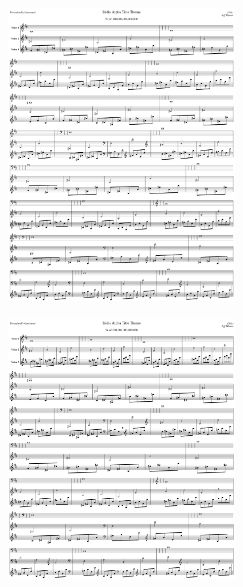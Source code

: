 \begin{figure}[H]                                             
{                                                             
  \setlength{\tabcolsep}{3.0pt}                               
  \setlength\cmidrulewidth{\heavyrulewidth} %
    \begin{subfigure}{0.5\textwidth}                            
  \includegraphics[width=6cm]{music/title_no_53_page_1001.png}%
    \end{subfigure}                                             
  \begin{subfigure}{0.5\textwidth}                            
  \includegraphics[width=6cm]{music/title_no_54_page_1001.png}%
    \end{subfigure}                                             
}                                                             
\end{figure}                                                  


